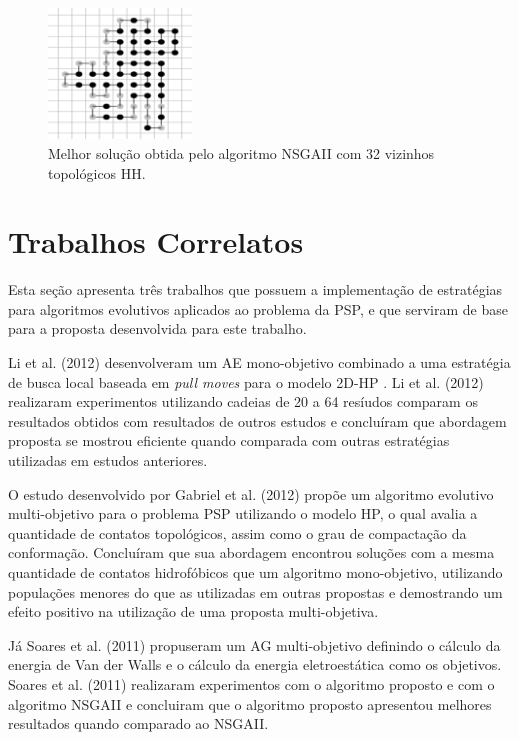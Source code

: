 \documentclass[conference]{IEEEtran}
\begin{document}
\begin{figure}[ht]
	\centering
	\includegraphics[width=1.5in]{nsgaiibestresults.png}
	\caption{Melhor solução obtida pelo algoritmo NSGAII com 32 vizinhos topológicos HH.}
	\label{bestSolutionNSGAII}
\end{figure}

\section{Trabalhos Correlatos}
Esta seção apresenta três trabalhos que possuem a
implementação de estratégias para algoritmos evolutivos
aplicados ao problema da PSP, e que serviram de base
para a proposta desenvolvida para este trabalho.

Li et al. (2012) \cite{li2012genetic} desenvolveram um AE mono-objetivo combinado a uma estratégia de busca local baseada em \textit{pull moves} para o modelo 2D-HP \cite{lesh2003complete}. Li et al. (2012) realizaram experimentos utilizando cadeias de 20 a 64 resíudos comparam os resultados obtidos com resultados de outros estudos e concluíram que abordagem proposta se mostrou eficiente quando comparada com outras estratégias utilizadas em estudos anteriores.

O estudo desenvolvido por Gabriel et al. (2012) \cite{gabriel2012algoritmos} propõe um algoritmo evolutivo multi-objetivo para o problema PSP utilizando o modelo HP, o qual avalia a
quantidade de contatos topológicos, assim como o grau de
compactação da conformação. Concluíram que sua abordagem
encontrou soluções com a mesma quantidade de contatos
hidrofóbicos que um algoritmo mono-objetivo, utilizando
populações menores do que as utilizadas em outras propostas
e demostrando um efeito positivo na utilização
de uma proposta multi-objetiva.

Já Soares et al. (2011) \cite{soares2011investigating} propuseram um AG multi-objetivo definindo o cálculo da energia de Van der Walls e o cálculo da energia eletroestática como os objetivos. Soares et al. (2011) realizaram experimentos com o algoritmo proposto e com o algoritmo NSGAII \cite{deb2002fast} e concluiram que o algoritmo proposto apresentou melhores resultados quando comparado ao NSGAII. 
\end{document}
